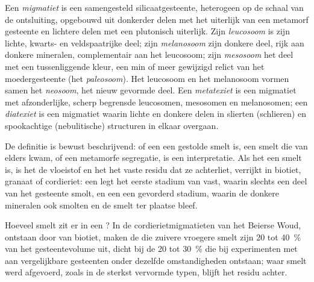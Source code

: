 \begin{definition}\label{def:b2:crustal-melting:migmatite}
Een \emph{migmatiet} is een samengesteld silicaatgesteente, heterogeen op de
schaal van de ontsluiting, opgebouwd uit donkerder delen met het uiterlijk van een metamorf gesteente en lichtere delen
met een plutonisch uiterlijk. Zijn \emph{leucosoom} is zijn lichte, kwarts- en
veldspaatrijke deel; zijn \emph{melanosoom} zijn donkere deel, rijk aan donkere
mineralen, complementair aan het leucosoom; zijn \emph{mesosoom} het deel met een tussenliggende
kleur, een min of meer gewijzigd relict van het moedergesteente (het \emph{paleosoom}). Het
leucosoom en het melanosoom vormen samen het \emph{neosoom}, het nieuw gevormde deel. Een
\emph{metatexiet} is een migmatiet met afzonderlijke, scherp begrensde leucosomen,
mesosomen en melanosomen; een \emph{diatexiet} is een migmatiet waarin lichte en
donkere delen in slierten (schlieren) en spookachtige (nebulitische) structuren in elkaar overgaan.
\end{definition}

De definitie is bewust beschrijvend: of een  een gestolde smelt is, een smelt
die van elders kwam, of een metamorfe segregatie, is een interpretatie. Als het een
smelt is, is het  de vloeistof en het  het vaste residu dat ze achterliet, verrijkt in
biotiet, granaat of cordieriet: een  legt het eerste stadium van  vast, waarin
slechts een deel van het gesteente smolt, en een  een gevorderd stadium, waarin de donkere mineralen
ook smolten en de smelt ter plaatse bleef.

Hoeveel smelt zit er in een ? In de cordierietmigmatieten van het Beierse Woud,
ontstaan door  van biotiet, maken de  die zuivere vroegere smelt zijn 20 tot
\qty{40}{\percent} van het gesteentevolume uit, dicht bij de 20 tot \qty{30}{\percent} die bij
experimenten met  aan vergelijkbare gesteenten onder dezelfde omstandigheden ontstaan; waar smelt werd
afgevoerd, zoals in de sterkst vervormde typen, blijft het residu achter.

